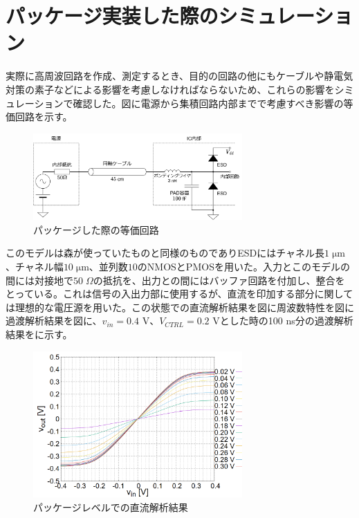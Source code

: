 \documentclass[twocolumn]{jsarticle}
\begin{document}
\section{パッケージ実装した際のシミュレーション}
    実際に高周波回路を作成、測定するとき、目的の回路の他にもケーブルや静電気対策の素子などによる影響を考慮しなければならないため、これらの影響をシミュレーションで確認した。図に電源から集積回路内部までで考慮すべき影響の等価回路を示す。
    \begin{figure}[H]
        \begin{center}
            \includegraphics*[width = 80mm]{figures/package_model.png}
            \caption{パッケージした際の等価回路}
            \label{fig:package_model}
        \end{center}
    \end{figure}
    このモデルは森が使っていたものと同様のものでありESDにはチャネル長$1\;\mathrm{\mu m}$、チャネル幅$10\;\mathrm{\mu m}$、並列数$10$のNMOSとPMOSを用いた。入力とこのモデルの間には対接地で$50\;\Omega$の抵抗を、出力との間にはバッファ回路を付加し、整合をとっている。これは信号の入出力部に使用するが、直流を印加する部分に関しては理想的な電圧源を用いた。この状態での直流解析結果を図に周波数特性を図に過渡解析結果を図に、$v_{in}=0.4$ V、$V_{CTRL}=0.2$ Vとした時の100 ns分の過渡解析結果をに示す。
    \begin{figure}[H]
        \begin{center}
            \includegraphics*[width = 80mm]{figures/sim_all_dc.PNG}
            \caption{パッケージレベルでの直流解析結果}
            \label{fig:sim_all_dc}
        \end{center}
    \end{figure}
\end{document}
